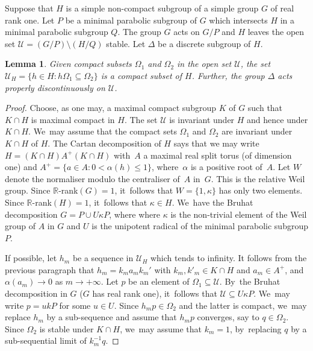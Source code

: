 \documentclass[JEP,XML,SOM,Unicode,published]{cedram}
\newtheorem{lemma}{Lemma}
\theoremstyle{definition}
\newcommand{\field}[1]{\mathbb{#1}}
\newcommand{\R}{\field{R}}
\begin{document}
Suppose that $H$ is a simple non-compact subgroup of a simple group
$G$ of real rank one. Let $P$ be a minimal parabolic subgroup of $G$
which intersects $H$ in a minimal parabolic subgroup $Q$. The group
$G$ acts on $G/P$ and $H$ leaves the open set ${\mathcal U}=(G/P)
\setminus (H/Q)$ stable. Let $\Delta $ be a discrete subgroup of $H$.

\begin{lemma} \label{pingpong} Given compact subsets $\Omega_1$ and
$\Omega_2$ in the open set ${\mathcal U}$, the set ${\mathcal U}_H =
\{h\in H: h\Omega_1\subseteq\Omega_2\}$ is a compact subset of $H$.
Further, the group $\Delta $ acts properly discontinuously on
${\mathcal U}$.
\end{lemma}

\begin{proof} Choose, as one may, a maximal compact subgroup $K$ of
$G$ such that $K\cap H$ is maximal compact in $H$. The set ${\mathcal
U}$ is invariant under $H$ and hence under $K\cap H$. We~may assume
that the compact sets $\Omega_1$ and $\Omega_2$ are invariant under
$K\cap H$ of $H$. The Cartan decomposition of $H$ says that we may
write $H=(K\cap H)A^+(K\cap H)$ with~$A$ a maximal real split torus
(of dimension one) and $A^+ =\{ a\in A: 0<\alpha (h)\leq 1\}$, where~$\alpha$ is a positive root of~$A$. Let $W$ denote the normaliser
modulo the centraliser of~$A$ in~$G$. This is the relative Weil
group. Since $\R$-rank$(G)=1$, it~follows that $W=\{1,\kappa\}$ has
only two elements. Since $\R$-rank$(H)=1$, it~follows that $\kappa
\in H$. We~have the Bruhat decomposition $G=P\cup U\kappa P$, where where $\kappa $ is the non-trivial element of the Weil group of $A$
in $G$ and $U$ is the unipotent radical of the minimal parabolic subgroup $P$. \par
If possible, let $h_m$ be a sequence in ${\mathcal U}_H$ which tends
to infinity. It follows from the previous paragraph that
$h_m=k_ma_mk_m'$ with $k_m,k'_m\in K\cap H$ and $a_m\in A^+$, and
$\alpha (a_m)\to 0$ as $m\to +\infty$. Let $p$ be an element of
$\Omega_1 \subseteq {\mathcal U}$. By~the Bruhat decomposition in $G$
($G$ has real rank one), it~follows that ${\mathcal U}\subseteq U\kappa
P$. We~may write $p=ukP$ for some $u\in U$. Since $h_mp\in
\Omega_2$ and the latter is compact, we~may replace $h_m$ by a
sub-sequence and assume that $h_mp$ converges, say to $q\in \Omega
_2$. Since $\Omega_2$ is stable under $K\cap H$, we~may assume that
$k_m=1$, by~replacing $q$ by a sub-sequential limit of $k_m^{-1}q$.


\end{proof}
\end{document}

